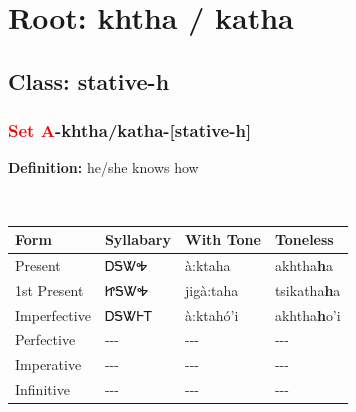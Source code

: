 \needspace{4in}
\section*{Root: khtha / katha}
\nopagebreak
{}
\needspace{3in}
\subsection*{Class: stative-h}
\nopagebreak
\needspace{2in}
\subsubsection*{\textcolor{Red}{Set A}{-}\textbf{khtha/katha}{-}[stative-h]}
\nopagebreak
\textbf{Definition: } he/she knows how
\\[0.5em]
\begin{tabularx}{\textwidth}{l X X X}%
\toprule%
\textbf{Form}&\textbf{Syllabary}&\textbf{With Tone}&\textbf{Toneless}\\%
\midrule%
Present&ᎠᎦᏔᎭ&à:ktaha&akhtha\textbf{h}a\\%
1st Present&ᏥᎦᏔᎭ&jigà:taha&tsikatha\textbf{h}a\\%
Imperfective&ᎠᎦᏔᎰᎢ&à:ktahó’i&akhtha\textbf{h}o'i\\%
Perfective&{-}{-}{-}&{-}{-}{-}&{-}{-}{-}\\%
Imperative&{-}{-}{-}&{-}{-}{-}&{-}{-}{-}\\%
Infinitive&{-}{-}{-}&{-}{-}{-}&{-}{-}{-}\\%
\bottomrule%
\end{tabularx}
\\[1em]